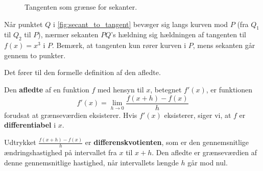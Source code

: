 \begin{figure}[htbp]
    \centering
    \caption{Tangenten som grænse for sekanter.}
    \label{fig:secant_to_tangent}
    \end{figure}
    
    Når punktet $Q$ i \autoref{fig:secant_to_tangent} bevæger sig langs kurven mod $P$ (fra $Q_1$ til $Q_2$ til $P$), nærmer sekanten $PQ$'s hældning sig hældningen af tangenten til $f(x) = x^3$ i $P$. Bemærk, at tangenten kun rører kurven i $P$, mens sekanten går gennem to punkter.
    
    Det fører til den formelle definition af den afledte.
    
    \begin{definition}
    Den \textbf{afledte} af en funktion \( f \) med hensyn til \( x \), betegnet \( f'(x) \), er funktionen
    \[
    f'(x) = \lim_{h \to 0} \frac{f(x+h) - f(x)}{h}
    \]
    forudsat at grænseværdien eksisterer. Hvis \( f'(x) \) eksisterer, siger vi, at \( f \) er \textbf{differentiabel} i \( x \).
    \end{definition}
    
    Udtrykket \( \frac{f(x+h) - f(x)}{h} \) er \textbf{differenskvotienten}, som er den gennemsnitlige ændringshastighed på intervallet fra \(x\) til \(x+h\). Den afledte er grænseværdien af denne gennemsnitlige hastighed, når intervallets længde \(h\) går mod nul.
    
